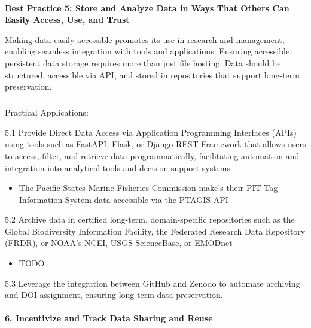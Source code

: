 \documentclass[
  letterpaper,
  DIV=11,
  numbers=noendperiod]{scrartcl}
\makeatletter
\let\oldparagraph\paragraph
\renewcommand{\paragraph}{
    \@ifstar
      \xxxParagraphStar
      \xxxParagraphNoStar
  }
\newcommand{\xxxParagraphStar}[1]{\oldparagraph*{#1}\mbox{}}
\newcommand{\xxxParagraphNoStar}[1]{\oldparagraph{#1}\mbox{}}
\let\oldsubparagraph\subparagraph
\renewcommand{\subparagraph}{
    \@ifstar
      \xxxSubParagraphStar
      \xxxSubParagraphNoStar
  }
\newcommand{\xxxSubParagraphStar}[1]{\oldsubparagraph*{#1}\mbox{}}
\newcommand{\xxxSubParagraphNoStar}[1]{\oldsubparagraph{#1}\mbox{}}
\providecommand{\tightlist}{%
  \setlength{\itemsep}{0pt}\setlength{\parskip}{0pt}}\usepackage{longtable,booktabs,array}
\makeatother
\begin{document}
\paragraph{\texorpdfstring{\textbf{Best Practice 5: Store and Analyze
Data in Ways That Others Can Easily Access, Use, and
Trust}}{Best Practice 5: Store and Analyze Data in Ways That Others Can Easily Access, Use, and Trust}}\label{best-practice-5-store-and-analyze-data-in-ways-that-others-can-easily-access-use-and-trust}

Making data easily accessible promotes its use in research and
management, enabling seamless integration with tools and applications.
Ensuring accessible, persistent data storage requires more than just
file hosting. Data should be structured, accessible via API, and stored
in repositories that support long-term preservation.

\subparagraph{Practical Applications:}\label{practical-applications-4}

5.1 Provide Direct Data Access via Application Programming Interfaces
(APIs) using tools such as FastAPI, Flask, or Django REST Framework that
allows users to access, filter, and retrieve data programmatically,
facilitating automation and integration into analytical tools and
decision-support systems

\begin{itemize}
\tightlist
\item
  The Pacific States Marine Fisheries Commission make's their
  \href{https://www.psmfc.org/program/pit-tag-information-systems-ptagis}{PIT
  Tag Information System} data accessible via the
  \href{https://api.ptagis.org/index.html\#:~:text=PTAGIS\%20API\%20Gets\%20a\%20list,PTAGIS\%20and\%20currently\%20contributing\%20data}{PTAGIS
  API}
\end{itemize}

5.2 Archive data in certified long-term, domain-specific repositories
such as the Global Biodiversity Information Facility, the Federated
Research Data Repository (FRDR), or NOAA's NCEI, USGS ScienceBase, or
EMODnet

\begin{itemize}
\tightlist
\item
  TODO
\end{itemize}

5.3 Leverage the integration between GitHub and Zenodo to automate
archiving and DOI assignment, ensuring long-term data preservation.

\paragraph{\texorpdfstring{\textbf{6. Incentivize and Track Data Sharing
and
Reuse}}{6. Incentivize and Track Data Sharing and Reuse}}\label{incentivize-and-track-data-sharing-and-reuse}
\end{document}
